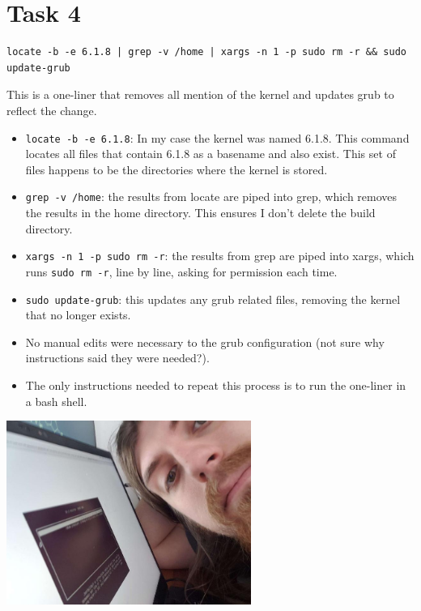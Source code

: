 \documentclass[11pt]{article}
\begin{document}
\section*{Task 4}
\label{sec:org608a632}
\begin{verbatim}
locate -b -e 6.1.8 | grep -v /home | xargs -n 1 -p sudo rm -r && sudo update-grub
\end{verbatim}
This is a one-liner that removes all mention of the kernel and updates grub to
reflect the change.
\begin{itemize}
\item \texttt{locate -b -e 6.1.8}: In my case the kernel was named 6.1.8. This command
locates all files that contain 6.1.8 as a basename and also exist. This set of
files happens to be the directories where the kernel is stored.
\item \texttt{grep -v /home}: the results from locate are piped into grep, which removes the
results in the home directory. This ensures I don't delete the build directory.
\item \texttt{xargs -n 1 -p sudo rm -r}: the results from grep are piped into xargs, which
runs \texttt{sudo rm -r}, line by line, asking for permission each time.
\item \texttt{sudo update-grub}: this updates any grub related files, removing the kernel
that no longer exists.
\item No manual edits were necessary to the grub configuration (not sure why
instructions said they were needed?).
\item The only instructions needed to repeat this process is to run the one-liner in
a bash shell.
\end{itemize}
\begin{center}
\includegraphics[width=8cm]{grub1.jpg}
\end{center}
\end{document}
